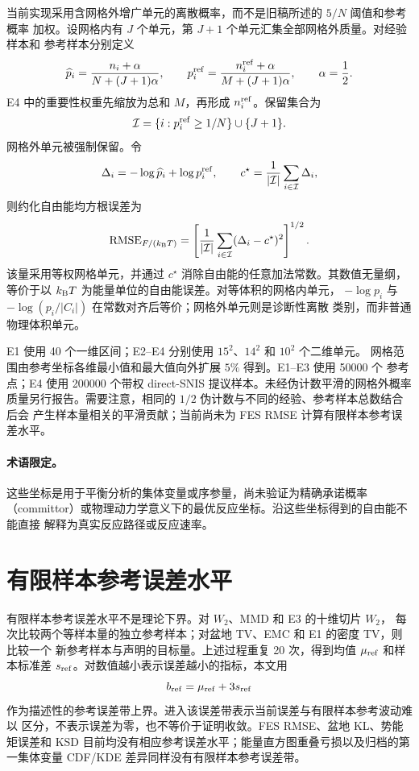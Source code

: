 \documentclass[11pt,a4paper]{article}
\begin{document}
当前实现采用含网格外增广单元的离散概率，而不是旧稿所述的 $5/N$ 阈值和参考概率
加权。设网格内有 $J$ 个单元，第 $J+1$ 个单元汇集全部网格外质量。对经验样本和
参考样本分别定义
\begin{equation}
 \widehat p_i=\frac{n_i+\alpha}{N+(J+1)\alpha},
 \qquad
 p_i^{\rm ref}=\frac{n_i^{\rm ref}+\alpha}{M+(J+1)\alpha},
 \qquad \alpha=\frac12.
\end{equation}
E4 中的重要性权重先缩放为总和 $M$，再形成 $n_i^{\rm ref}$。保留集合为
\begin{equation}
 \mathcal I=\{i:p_i^{\rm ref}\ge 1/N\}\cup\{J+1\}.
\end{equation}
网格外单元被强制保留。令
\begin{equation}
 \Delta_i=-\log\widehat p_i+\log p_i^{\rm ref},
 \qquad
 c^\star=\frac1{|\mathcal I|}\sum_{i\in\mathcal I}\Delta_i,
\end{equation}
则约化自由能均方根误差为
\begin{equation}
 \operatorname{RMSE}_{F/(k_{\rm B}T)}
 =
 \left[
 \frac1{|\mathcal I|}
 \sum_{i\in\mathcal I}(\Delta_i-c^\star)^2
 \right]^{1/2}.
\end{equation}
该量采用等权网格单元，并通过 $c^\star$ 消除自由能的任意加法常数。其数值无量纲，
等价于以 $k_{\rm B}T$ 为能量单位的自由能误差。对等体积的网格内单元，
$-\log p_i$ 与 $-\log(p_i/|C_i|)$ 在常数对齐后等价；网格外单元则是诊断性离散
类别，而非普通物理体积单元。

E1 使用 40 个一维区间；E2--E4 分别使用 $15^2$、$14^2$ 和 $10^2$ 个二维单元。
网格范围由参考坐标各维最小值和最大值向外扩展 $5\%$ 得到。E1--E3 使用 50000 个
参考点；E4 使用 200000 个带权 direct-SNIS 提议样本。未经伪计数平滑的网格外概率
质量另行报告。需要注意，相同的 $1/2$ 伪计数与不同的经验、参考样本总数结合后会
产生样本量相关的平滑贡献；当前尚未为 FES RMSE 计算有限样本参考误差水平。

\paragraph{术语限定。}
这些坐标是用于平衡分析的集体变量或序参量，尚未验证为精确承诺概率
（committor）或物理动力学意义下的最优反应坐标。沿这些坐标得到的自由能不能直接
解释为真实反应路径或反应速率。

\section{有限样本参考误差水平}

有限样本参考误差水平不是理论下界。对 $W_2$、MMD 和 E3 的十维切片 $W_2$，
每次比较两个等样本量的独立参考样本；对盆地 TV、EMC 和 E1 的密度 TV，则比较一个
新参考样本与声明的目标量。上述过程重复 20 次，得到均值
$\mu_{\rm ref}$ 和样本标准差 $s_{\rm ref}$。对数值越小表示误差越小的指标，本文用
\begin{equation}
 b_{\rm ref}=\mu_{\rm ref}+3s_{\rm ref}
\end{equation}
作为描述性的参考误差带上界。进入该误差带表示当前误差与有限样本参考波动难以
区分，不表示误差为零，也不等价于证明收敛。FES RMSE、盆地 KL、势能矩误差和 KSD
目前均没有相应参考误差水平；能量直方图重叠亏损以及归档的第一集体变量 CDF/KDE
差异同样没有有限样本参考误差带。
\end{document}
